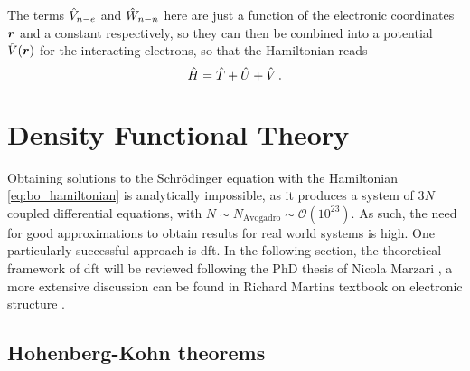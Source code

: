 \documentclass[main.tex]{subfiles}
\begin{document}
The terms \(\hat{V}_{n-e}\) and \(\hat{W}_{n-n}\) here are just a function of the electronic coordinates \(\vb*{r}\) and a constant respectively, so they can then be combined into a potential \(\hat{V} (\vb*{r})\) for the interacting electrons, so that the Hamiltonian reads
\begin{equation}\label{eq:solid_state_hamiltonian}
    \hat{H} = \hat{T} + \hat{U} + \hat{V}\,.
\end{equation}

\section{Density Functional Theory\label{sec:theory_dft}}

Obtaining solutions to the Schrödinger equation with the Hamiltonian \ref{eq:bo_hamiltonian} is analytically impossible, as it produces a system of \(3N\) coupled differential equations, with \(N \sim N_{\mathrm{Avogadro}} \sim \mathcal{O} (10^{23})\).
As such, the need for good approximations to obtain results for real world
systems is high.
One particularly successful approach is \acrfull{dft}.
In the following section, the theoretical framework of \acrshort{dft} will be reviewed following the PhD thesis of Nicola Marzari \cite{marzari_ab-initio_1996}, a more extensive discussion can be found in Richard Martins textbook on electronic structure \cite{martin_electronic_2004}.

\subsection{Hohenberg-Kohn theorems}
\end{document}
